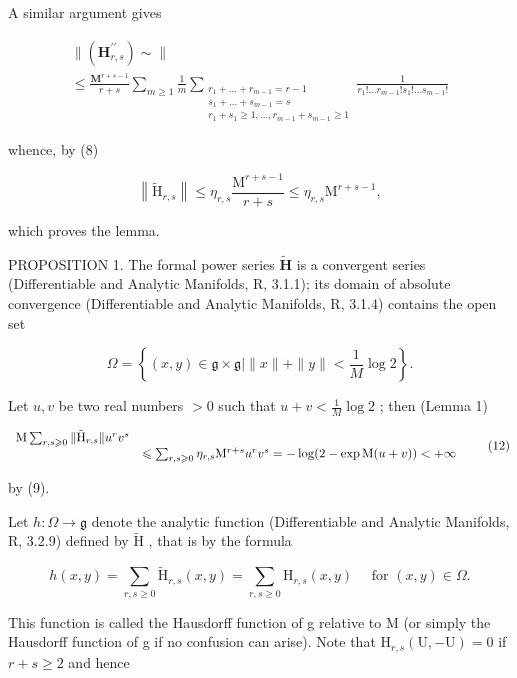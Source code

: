 A similar argument gives

\[
\begin{array}{l}\| (\mathbf{H}_{r,s}^{\prime \prime})\sim \| \\ \leqslant \frac{\mathbf{M}^{r + s - 1}}{r + s}\sum_{m\geqslant 1}\frac{1}{m}\sum_{\substack{r_{1} + \dots +r_{m - 1} = r - 1\\ s_{1} + \dots +s_{m - 1} = s\\ r_{1} + s_{1}\geqslant 1,\ldots ,r_{m - 1} + s_{m - 1}\geqslant 1}}\frac{1}{r_{1}!\ldots r_{m - 1}!s_{1}!\ldots s_{m - 1}!} \end{array}\tag{11}
\]

whence, by (8)

\[
\left\| \tilde {\mathrm{H}} _ {r, s} \right\| \leqslant   \eta_ {r, s} \frac {\mathrm{M} ^ {r + s - 1}}{r + s} \leqslant \eta_ {r, s} \mathrm{M} ^ {r + s - 1},
\]

which proves the lemma.

PROPOSITION 1. The formal power series \(\tilde{\mathbf{H}}\) is a convergent series (Differentiable and Analytic Manifolds, R, 3.1.1); its domain of absolute convergence (Differentiable and Analytic Manifolds, R, 3.1.4) contains the open set

\[
\Omega = \left\{(x, y) \in \mathfrak {g} \times \mathfrak {g} | \| x \| + \| y \| <   \frac {1}{M} \log 2 \right\}.
\]

Let \(u, v\) be two real numbers \(> 0\) such that \(u + v < \frac{1}{M} \log 2\) ; then (Lemma 1)

\[
\begin{array}{r l} \mathrm{M} \sum_ {r, s \geqslant 0} \| \tilde {\mathrm{H}} _ {r, s} \| u ^ {r} v ^ {s} \\ & \leqslant \sum_ {r, s \geqslant 0} \eta_ {r, s} \mathrm{M} ^ {r + s} u ^ {r} v ^ {s} = - \log (2 - \exp \mathrm{M} (u + v)) <   + \infty \end{array} \tag {12}
\]

by (9).

Let \(h: \Omega \to \mathfrak{g}\) denote the analytic function (Differentiable and Analytic Manifolds, R, 3.2.9) defined by \(\tilde{\mathrm{H}}\) , that is by the formula

\[
h (x, y) = \sum_ {r, s \geqslant 0} \tilde {\mathrm{H}} _ {r, s} (x, y) = \sum_ {r, s \geqslant 0} \mathrm{H} _ {r, s} (x, y) \quad \text { for } (x, y) \in \Omega .\tag{13}
\]

This function is called the Hausdorff function of g relative to M (or simply the Hausdorff function of g if no confusion can arise). Note that \(\mathrm{H}_{r,s}(\mathrm{U}, -\mathrm{U}) = 0\) if \(r + s \geqslant 2\) and hence

